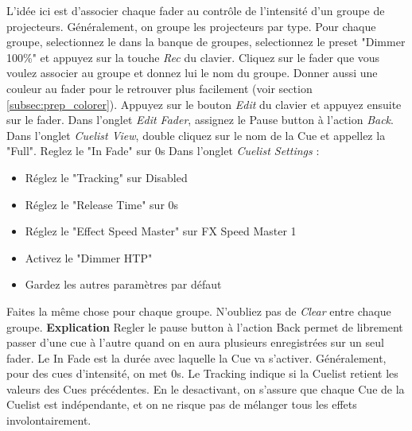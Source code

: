 L'idée ici est d'associer chaque fader au contrôle de l'intensité d'un groupe de projecteurs.
Généralement, on groupe les projecteurs par type.
\newline
\newline
Pour chaque groupe, selectionnez le dans la banque de groupes, selectionnez le preset "Dimmer 100\%" et appuyez sur la touche \textit{Rec} du clavier.
Cliquez sur le fader que vous voulez associer au groupe et donnez lui le nom du groupe.
\newline
Donner aussi une couleur au fader pour le retrouver plus facilement (voir section \ref{subsec:prep_colorer}).
\newline
\newline
Appuyez sur le bouton \textit{Edit} du clavier et appuyez ensuite sur le fader.
\newline
\newline
Dans l'onglet \textit{Edit Fader}, assignez le Pause button à l'action \textit{Back}.
\newline
Dans l'onglet \textit{Cuelist View}, double cliquez sur le nom de la Cue et appellez la "Full".
Reglez le "In Fade" sur 0s
\newline
Dans l'onglet \textit{Cuelist Settings} :
\begin{itemize}{}
    \item Réglez le "Tracking" sur Disabled
    \item Réglez le "Release Time" sur 0s
    \item Réglez le "Effect Speed Master" sur FX Speed Master 1
    \item Activez le "Dimmer HTP"
    \item Gardez les autres paramètres par défaut
\end{itemize}
Faites la même chose pour chaque groupe. N'oubliez pas de \textit{Clear} entre chaque groupe.
\newline
\newline
\textbf{Explication}
\newline
\newline
Regler le pause button à l'action Back permet de librement passer d'une cue à l'autre quand on en aura plusieurs enregistrées sur un seul fader.
\newline
Le In Fade est la durée avec laquelle la Cue va s'activer. Généralement, pour des cues d'intensité, on met 0s.
\newline
Le Tracking indique si la Cuelist retient les valeurs des Cues précédentes.
En le desactivant, on s'assure que chaque Cue de la Cuelist est indépendante, et on ne risque pas de mélanger tous les effets involontairement.
